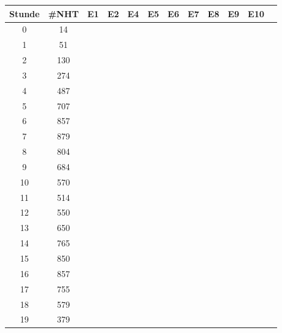 \begin{table}
    \centering
    \begin{tabular}{||c|c|c|c|c|c|c|c|c|c|c|c||}
        \hline
        Stunde  & \#NHT  & E1 & E2 & E4 & E5 & E6 & E7 & E8 & E9 & E10 \\\hline\hline
        0       & 14     &    &    &    &    &    &    &    &    &     \\\hline
        1       & 51     &    &    &    &    &    &    &    &    &     \\\hline
        2       & 130    &    &    &    &    &    &    &    &    &     \\\hline
        3       & 274    &    &    &    &    &    &    &    &    &     \\\hline
        4       & 487    &    &    &    &    &    &    &    &    &     \\\hline
        5       & 707    &    &    &    &    &    &    &    &    &     \\\hline
        6       & 857    &    &    &    &    &    &    &    &    &     \\\hline
        7       & 879    &    &    &    &    &    &    &    &    &     \\\hline
        8       & 804    &    &    &    &    &    &    &    &    &     \\\hline
        9       & 684    &    &    &    &    &    &    &    &    &     \\\hline
        10      & 570    &    &    &    &    &    &    &    &    &     \\\hline
        11      & 514    &    &    &    &    &    &    &    &    &     \\\hline
        12      & 550    &    &    &    &    &    &    &    &    &     \\\hline
        13      & 650    &    &    &    &    &    &    &    &    &     \\\hline
        14      & 765    &    &    &    &    &    &    &    &    &     \\\hline
        15      & 850    &    &    &    &    &    &    &    &    &     \\\hline
        16      & 857    &    &    &    &    &    &    &    &    &     \\\hline
        17      & 755    &    &    &    &    &    &    &    &    &     \\\hline
        18      & 579    &    &    &    &    &    &    &    &    &     \\\hline
        19      & 379    &    &    &    &    &    &    &    &    &     \\\hline

\end{tabular}
\end{table}
